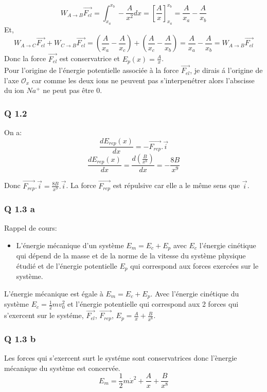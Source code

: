 \documentclass[]{book}
\theoremstyle{definition}
\begin{document}
$$W_{A \to B} \overrightarrow{F_{el}} = \int_{x_a}^{x_b} -\frac{A}{x^2}dx = \left[ \frac{A}{x} \right]_{x_a}^{x_b} = \frac{A}{x_a} -\frac{A}{x_b}$$
Et,
$$W_{A \to C} \overrightarrow{F_{el}} + W_{C \to B} \overrightarrow{F_{el}} = (\frac{A}{x_a} -\frac{A}{x_c}) + (\frac{A}{x_c} -\frac{A}{x_b}) = \frac{A}{x_a} -\frac{A}{x_b} = W_{A \to B} \overrightarrow{F_{el}}$$
Donc la force $\overrightarrow{F_{el}}$ est conservatrice et $E_p(x) = \frac{A}{x}$.\\

Pour l'origine de l'\'energie potentielle associ\'ee \`a la force $\overrightarrow{F_{el}}$, je dirais \'a l'origine de l'axe $\mathcal{O}_x$  car comme les deux ions ne peuvent pas s'interpen\'etrer alors l'abscisse du ion $Na^{+}$ ne peut pas \^etre $0$.


\subsubsection*{Q 1.2}
On a: $$\frac{dE_{rep}(x)}{dx} = -\overrightarrow{F_{rep}}.\overrightarrow{i}$$
$$\frac{dE_{rep}(x)}{dx} = \frac{d(\frac{B}{x^8})}{dx} = -\frac{8B}{x^9}$$

Donc $\overrightarrow{F_{rep}}.\overrightarrow{i} = \frac{8B}{x^9}.\overrightarrow{i}$. La force $\overrightarrow{F_{rep}}$ est r\'epulsive car elle a le m\^eme sens que $\overrightarrow{i}$.


\subsubsection*{Q 1.3 a}
Rappel de cours:
\begin{itemize}
\item L'\'energie m\'ecanique d'un syst\`eme $E_m = E_c + E_p$ avec $E_c$ l'\'energie cin\'etique qui d\'epend de la masse et de la norme de la vitesse du syst\`eme physique \'etudi\'e et de l'\'energie potentielle $E_p$ qui correspond aux forces exerc\'ees sur le syst\`eme.
\end{itemize}

L'\'energie m\'ecanique est \'egale \`a $E_m = E_c + E_p$. Avec l'\'energie cin\'etique du syst\`eme $E_c = \frac{1}{2}mv_0^2$ et l'\'energie potentielle qui correspond aux 2 forces qui s'exercent sur le syst\'eme, $\overrightarrow{F_{el}}$, $\overrightarrow{F_{rep}}$, $E_p = \frac{A}{x} + \frac{B}{x^8}$. 

\subsubsection*{Q 1.3 b}
Les forces qui s'exercent surt le syst\'eme sont conservatrices donc l'\`energie m\'ecanique du syst\`eme est concerv\'ee.
$$E_m = \frac{1}{2}m\dot{x}^2 + \frac{A}{x} + \frac{B}{x^8}$$
\end{document}
